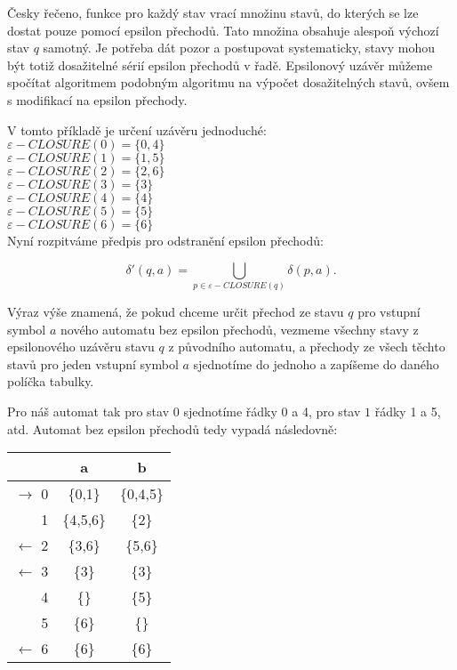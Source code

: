 \documentclass{article}
\begin{document}
Česky řečeno, funkce pro každý stav vrací množinu stavů, do kterých se lze dostat pouze pomocí epsilon přechodů. Tato množina obsahuje alespoň výchozí stav $q$ samotný. Je potřeba dát pozor a postupovat systematicky, stavy mohou být totiž dosažitelné sérií epsilon přechodů v řadě. Epsilonový uzávěr můžeme spočítat algoritmem podobným algoritmu na výpočet dosažitelných stavů, ovšem s modifikací na epsilon přechody.

\noindent V tomto příkladě je určení uzávěru jednoduché:\\
$\varepsilon-CLOSURE(0)= \{0,4\}$\\
$\varepsilon-CLOSURE(1)= \{1,5\}$\\
$\varepsilon-CLOSURE(2)= \{2,6\}$\\
$\varepsilon-CLOSURE(3)= \{3\}$\\
$\varepsilon-CLOSURE(4)= \{4\}$\\
$\varepsilon-CLOSURE(5)= \{5\}$\\
$\varepsilon-CLOSURE(6)= \{6\}$\\

Nyní rozpitváme předpis pro odstranění epsilon přechodů:

$$\delta'(q,a)=\bigcup_{p\in\varepsilon-CLOSURE(q)} \delta(p,a).$$

Výraz výše znamená, že pokud chceme určit přechod ze stavu $q$ pro vstupní symbol $a$ nového automatu bez epsilon přechodů, vezmeme všechny stavy z epsilonového uzávěru stavu $q$ z původního automatu, a přechody ze všech těchto stavů pro jeden vstupní symbol $a$ sjednotíme do jednoho a zapíšeme do daného políčka tabulky.

Pro náš automat tak pro stav $0$ sjednotíme řádky 0 a 4, pro stav $1$ řádky 1 a 5, atd.
Automat bez epsilon přechodů tedy vypadá následovně:

\begin{tabular}{|r||c|c|}
\hline
             $ $     &   a      &    b       \\
\hline
$\rightarrow$   0  & \{0,1\}  &   \{0,4,5\} \\
                1  & \{4,5,6\}  &    \{2\}  \\
$\leftarrow$    2  & \{3,6\}    &   \{5,6\} \\
$\leftarrow$    3  & \{3\}    &   \{3\}     \\ 
                4  & \{\}     &   \{5\}\\
                5  & \{6\}    &   \{\} \\
$\leftarrow$    6  & \{6\}    &   \{6\}\\
\hline
\end{tabular}
\end{document}
